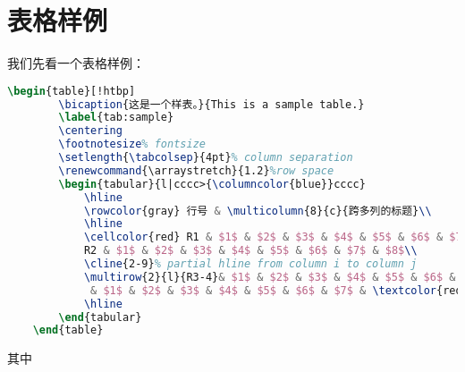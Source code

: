 \section{表格样例}
我们先看一个表格样例：
\begin{lstlisting}[language=tex]
    \begin{table}[!htbp]
        \bicaption{这是一个样表。}{This is a sample table.}
        \label{tab:sample}
        \centering
        \footnotesize% fontsize
        \setlength{\tabcolsep}{4pt}% column separation
        \renewcommand{\arraystretch}{1.2}%row space 
        \begin{tabular}{l|cccc>{\columncolor{blue}}cccc}
            \hline
            \rowcolor{gray} 行号 & \multicolumn{8}{c}{跨多列的标题}\\
            \hline
            \cellcolor{red} R1 & $1$ & $2$ & $3$ & $4$ & $5$ & $6$ & $7$ & $8$\\
            R2 & $1$ & $2$ & $3$ & $4$ & $5$ & $6$ & $7$ & $8$\\
            \cline{2-9}% partial hline from column i to column j
            \multirow{2}{l}{R3-4}& $1$ & $2$ & $3$ & $4$ & $5$ & $6$ & $7$ & $8$\\
             & $1$ & $2$ & $3$ & $4$ & $5$ & $6$ & $7$ & \textcolor{red}{$8$}\\
            \hline
        \end{tabular}
    \end{table}
\end{lstlisting}
其中
